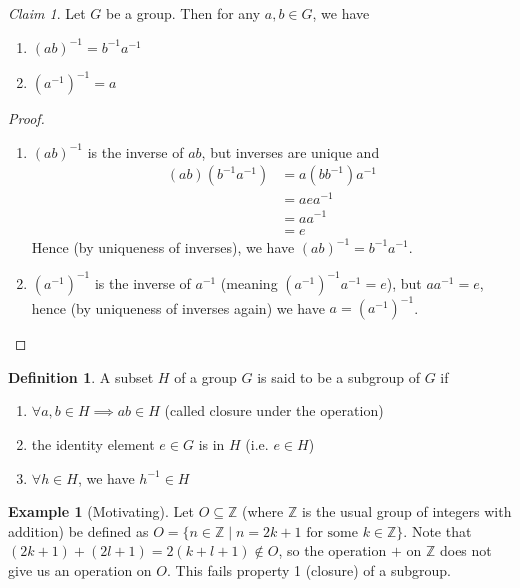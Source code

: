 \documentclass[12pt,letterpaper,DIV=11,final]{scrartcl}
\theoremstyle{plain}
\theoremstyle{definition}
\newtheorem{definition}{Definition}[section]
\newtheorem{example}{Example}[section]
\theoremstyle{remark}
\newtheorem{claim}{Claim}
\begin{document}
\begin{claim}
  Let $G$ be a group.
  Then for any $a, b \in G$, we have \begin{enumerate}
    \item ${(ab)}^{-1} = b^{-1} a^{-1}$
    \item ${(a^{-1})}^{-1} = a$
  \end{enumerate}

  \begin{proof}\leavevmode
    \begin{enumerate}
      \item ${(ab)}^{-1}$ is the inverse of $ab$, but inverses are unique and
        \begin{align*}
          (ab)(b^{-1} a^{-1}) &= a (b b^{-1}) a^{-1} \\
                              &= a e a^{-1} \\
                              &= a a^{-1} \\
                              &= e
        \end{align*}
        Hence (by uniqueness of inverses), we have ${(ab)}^{-1} = b^{-1} a^{-1}$.

      \item ${(a^{-1})}^{-1}$ is the inverse of $a^{-1}$ (meaning ${(a^{-1})}^{-1} a^{-1} = e$), but $a a^{-1} = e$, hence (by uniqueness of inverses again) we have $a = {(a^{-1})}^{-1}$.
        \qedhere
    \end{enumerate}
  \end{proof}
\end{claim}

\begin{definition}
  A subset $H$ of a group $G$ is said to be a subgroup of $G$ if \begin{enumerate}
    \item $\forall a, b \in H \implies ab \in H$ (called closure under the operation)
    \item the identity element $e \in G$ is in $H$ (i.e. $e \in H$)
    \item $\forall h \in H$, we have $h^{-1} \in H$
  \end{enumerate}
\end{definition}

\begin{example}[Motivating]\label{mex:odds}
  Let $O \subseteq \mathbb{Z}$ (where $\mathbb{Z}$ is the usual group of integers with addition) be defined as $O = \{ n \in \mathbb{Z} \mid n = 2k + 1 \text{ for some } k \in \mathbb{Z} \}$.
  Note that $(2k + 1) + (2l + 1) = 2 (k + l + 1) \notin O$, so the operation $+$ on $\mathbb{Z}$ does not give us an operation on $O$.
  This fails property 1 (closure) of a subgroup.
\end{example}
\end{document}
